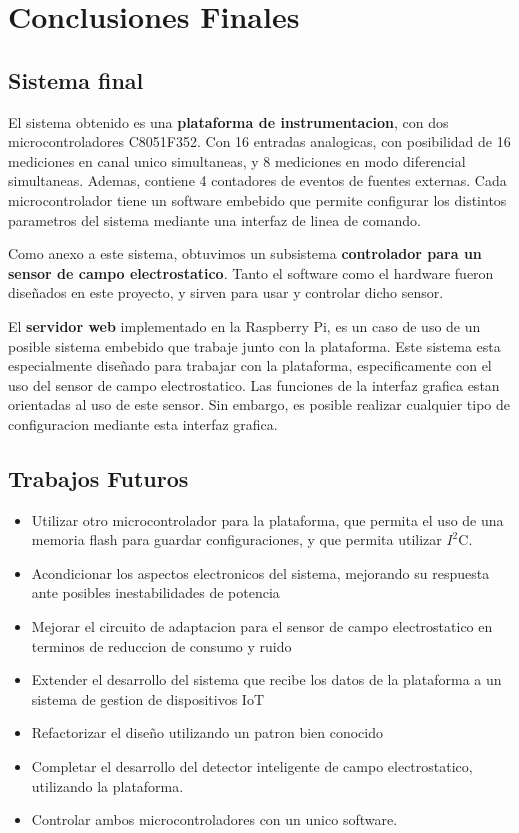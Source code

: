 \chapter{Conclusiones Finales} %
\label{cha:conclusiones}

\section{Sistema final} %
\label{sec:sistema_final}

El sistema obtenido es una \textbf{plataforma de instrumentacion}, con dos microcontroladores C8051F352. Con 16 entradas analogicas, con posibilidad de 16 mediciones en canal unico simultaneas, y 8 mediciones en modo diferencial simultaneas. Ademas, contiene 4 contadores de eventos de fuentes externas. Cada microcontrolador tiene un software embebido que permite configurar los distintos parametros del sistema mediante una interfaz de linea de comando.

Como anexo a este sistema, obtuvimos un subsistema \textbf{controlador para un sensor de campo electrostatico}. Tanto el software como el hardware fueron diseñados en este proyecto, y sirven para usar y controlar dicho sensor.

El \textbf{servidor web} implementado en la Raspberry Pi, es un caso de uso de un posible sistema embebido que trabaje junto con la plataforma. Este sistema esta especialmente diseñado para trabajar con la plataforma, especificamente con el uso del sensor de campo electrostatico. Las funciones de la interfaz grafica estan orientadas al uso de este sensor. Sin embargo, es posible realizar cualquier tipo de configuracion mediante esta interfaz grafica.


\section{Trabajos Futuros} %
\label{sec:trabajos_futuros}

\begin{itemize}
	\item Utilizar otro microcontrolador para la plataforma, que permita el uso de una memoria flash para guardar configuraciones, y que permita utilizar $I^{2}$C.
	\item Acondicionar los aspectos electronicos del sistema, mejorando su respuesta ante posibles inestabilidades de potencia
	\item Mejorar el circuito de adaptacion para el sensor de campo electrostatico en terminos de reduccion de consumo y ruido
	\item Extender el desarrollo del sistema que recibe los datos de la plataforma a un sistema de gestion de dispositivos IoT
	\item Refactorizar el diseño utilizando un patron bien conocido
	\item Completar el desarrollo del detector inteligente de campo electrostatico, utilizando la plataforma.
	\item Controlar ambos microcontroladores con un unico software.
\end{itemize}




